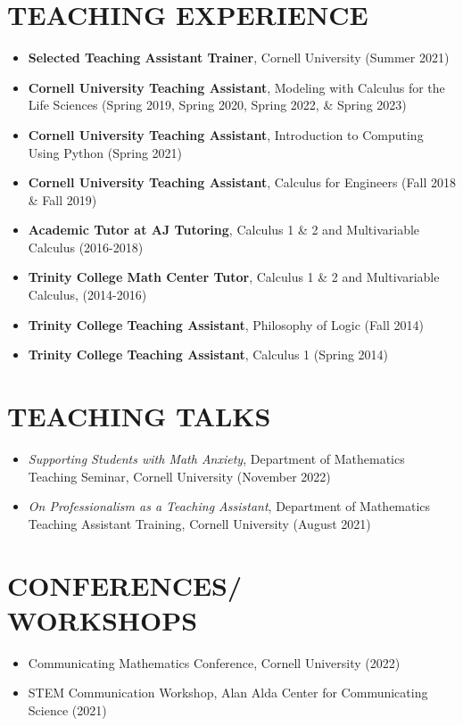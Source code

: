 \documentclass{res} %
\begin{document}
\begin{resume}
\section{TEACHING EXPERIENCE}
\begin{itemize}
    \item \textbf{Selected Teaching Assistant Trainer}, Cornell University (Summer 2021)
    \item \textbf{Cornell University Teaching Assistant}, Modeling with Calculus for the Life Sciences (Spring 2019, Spring 2020, Spring 2022, \&  Spring 2023)
    \item \textbf{Cornell University Teaching Assistant}, Introduction to Computing Using Python (Spring 2021)
    \item \textbf{Cornell University Teaching Assistant}, Calculus for Engineers (Fall 2018 \& Fall 2019) 
    \item \textbf{Academic Tutor at AJ Tutoring}, Calculus 1 \& 2 and Multivariable Calculus (2016-2018)
    \item \textbf{Trinity College Math Center Tutor}, Calculus 1 \& 2 and Multivariable Calculus, (2014-2016)
    \item \textbf{Trinity College Teaching Assistant}, Philosophy of Logic (Fall 2014)
    \item \textbf{Trinity College Teaching Assistant}, Calculus 1 (Spring 2014)
\end{itemize}

\section{TEACHING TALKS}
\begin{itemize}
\item \textit{Supporting Students with Math Anxiety}, Department of Mathematics Teaching Seminar, Cornell University (November 2022)
\item \textit{On Professionalism as a Teaching Assistant}, Department of Mathematics Teaching Assistant Training, Cornell University (August 2021)
\end{itemize}


\section{CONFERENCES/\\WORKSHOPS}
\begin{itemize}
	\item Communicating Mathematics Conference, Cornell University (2022)
	\item STEM Communication Workshop, Alan Alda Center for Communicating Science (2021)
\end{itemize}


\end{resume}
\end{document}
